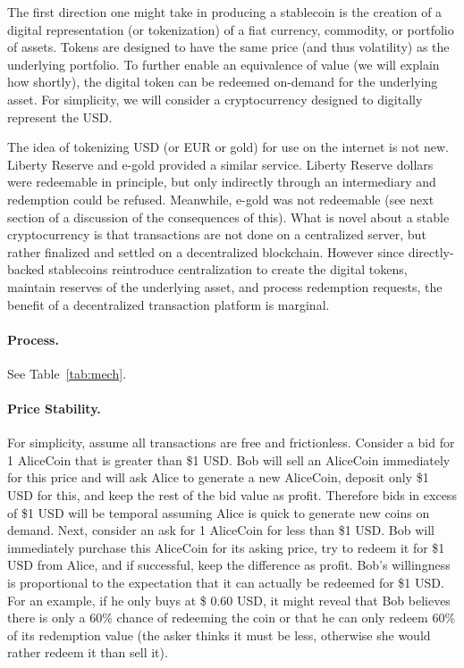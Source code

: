 The first direction one might take in producing a stablecoin is the creation of a digital representation (or tokenization) of a fiat currency, commodity, or portfolio of assets. Tokens are designed to have the same price (and thus volatility) as the underlying portfolio. To further enable an equivalence of value (we will explain how shortly), the digital token can be redeemed on-demand for the underlying asset. For simplicity, we will consider a cryptocurrency designed to digitally represent the USD.

The idea of tokenizing USD (or EUR or gold) for use on the internet is not new. Liberty Reserve and e-gold provided a similar service. Liberty Reserve dollars were redeemable in principle, but only indirectly through an intermediary and redemption could be refused. Meanwhile, e-gold was not redeemable (see next section of a discussion of the consequences of this). What is novel about a stable cryptocurrency is that transactions are not done on a centralized server, but rather finalized and settled on a decentralized blockchain. However since directly-backed stablecoins reintroduce centralization to create the digital tokens, maintain reserves of the underlying asset, and process redemption requests, the benefit of a decentralized transaction platform is marginal.

\paragraph{Process.} See Table~\ref{tab:mech}.

\paragraph{Price Stability.} For simplicity, assume all transactions are free and frictionless. Consider a bid for 1 AliceCoin that is greater than \$1 USD. Bob will sell an AliceCoin immediately for this price and will ask Alice to generate a new AliceCoin, deposit only \$1 USD for this, and keep the rest of the bid value as profit. Therefore bids in excess of \$1 USD will be temporal assuming Alice is quick to generate new coins on demand. Next, consider an ask for 1 AliceCoin for less than \$1 USD. Bob will immediately purchase this AliceCoin for its asking price, try to redeem it for \$1 USD from Alice, and if successful, keep the difference as profit. Bob's willingness is proportional to the expectation that it can actually be redeemed for \$1 USD. For an example, if he only buys at \$ 0.60 USD, it might reveal that Bob believes there is only a 60\% chance of redeeming the coin or that he can only redeem 60\% of its redemption value (the asker thinks it must be less, otherwise she would rather redeem it than sell it).

